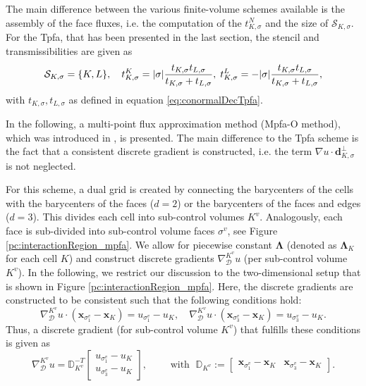 The main difference between the various finite-volume schemes available is the assembly of the face fluxes, i.e. the computation of the $t^N_{K,\sigma}$ and the size of $\mathcal{S}_{K,\sigma}$. For the Tpfa, that has been presented in the last section, the stencil and transmissibilities are given as
\begin{equation*}
\mathcal{S}_{K,\sigma} = \lbrace K,L \rbrace, \quad t^K_{K,\sigma} =  \lvert{\sigma}\rvert  \frac{t_{K,\sigma} t_{L,\sigma}}{t_{K,\sigma} + t_{L,\sigma}},\; t^L_{K,\sigma} =  -\lvert{\sigma}\rvert  \frac{t_{K,\sigma} t_{L,\sigma}}{t_{K,\sigma} + t_{L,\sigma}},
\end{equation*}
with $t_{K,\sigma},t_{L,\sigma}$ as defined in equation \eqref{eq:conormalDecTpfa}.

In the following, a multi-point flux approximation method (Mpfa-O method), which was introduced in \citet{A3:aavatsmark:2002}, is presented. The main difference to the Tpfa scheme is the fact that a consistent discrete gradient is constructed, i.e. the term $\nabla u \cdot \mathbf{d}^{\bot}_{K,\sigma}$ is not neglected.

For this scheme, a dual grid is created by connecting the barycenters of the cells with the barycenters of the faces ($d=2$) or the barycenters of the faces and edges ($d=3$). This divides each cell into sub-control volumes $K^v$. Analogously, each face is sub-divided into sub-control volume faces $\sigma^v$, see Figure \ref{pc:interactionRegion_mpfa}. We allow for piecewise constant $\mathbf{\Lambda}$ (denoted as $\mathbf{\Lambda}_K$ for each cell $K$) and construct discrete gradients $\nabla_\mathcal{D}^{K^v} u$ (per sub-control volume $K^v$). 
In the following, we restrict our discussion to the two-dimensional setup that is shown in Figure \ref{pc:interactionRegion_mpfa}.  
Here, the discrete gradients are constructed to be consistent such that the following conditions hold:
\begin{equation}
\nabla_\mathcal{D}^{K^v} u \cdot (\mathbf{x}_{\sigma^v_1}- \mathbf{x}_{K}) = u_{\sigma^v_1} - u_K, \quad \nabla_\mathcal{D}^{K^v} u \cdot (\mathbf{x}_{\sigma^v_3}- \mathbf{x}_{K}) = u_{\sigma^v_3} - u_K.
\end{equation}
Thus, a discrete gradient (for sub-control volume $K^v$) that fulfills  these conditions is given as
\begin{equation}
\nabla_\mathcal{D}^{K^v} u  = \mathbb{D}^{-T}_{K^v}
 \begin{bmatrix}
  u_{\sigma^v_1} - u_K \\
  u_{\sigma^v_3} - u_K
 \end{bmatrix}, \qquad \text{ with }\; \mathbb{D}_{K^v} := 
  \begin{bmatrix}
   \mathbf{x}_{\sigma^v_1}- \mathbf{x}_K & \mathbf{x}_{\sigma^v_3} - \mathbf{x}_K
 \end{bmatrix}.
 \label{eq:MPFAGradientRecons}
\end{equation}

